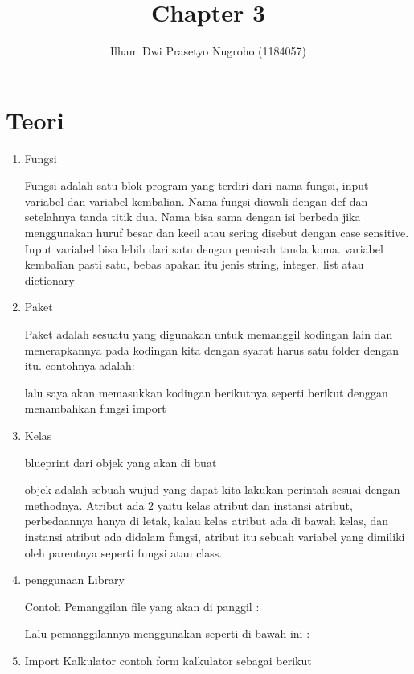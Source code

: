 \documentclass{article}
\title{Chapter 3}
\author{Ilham Dwi Prasetyo Nugroho (1184057)}
\begin{document}
\maketitle
\section{Teori}
\begin{enumerate}
\item Fungsi
\par Fungsi adalah satu blok program yang terdiri dari nama fungsi, input variabel dan variabel kembalian. Nama fungsi diawali dengan def dan setelahnya tanda titik dua. Nama bisa sama dengan isi berbeda jika menggunakan huruf besar dan kecil atau sering disebut dengan case sensitive. Input variabel bisa lebih dari satu dengan
pemisah tanda koma. variabel kembalian pasti satu, bebas apakan itu jenis string, integer, list atau dictionary

\item Paket
\par Paket adalah sesuatu yang digunakan untuk memanggil kodingan lain dan menerapkannya pada kodingan kita dengan syarat harus satu folder dengan itu.  contohnya adalah:

\par lalu saya akan memasukkan kodingan berikutnya seperti berikut denggan menambahkan fungsi import

\item Kelas
\par blueprint dari objek yang akan di buat

\par objek adalah sebuah wujud yang dapat kita lakukan perintah sesuai dengan methodnya. Atribut ada 2 yaitu kelas atribut dan instansi atribut, perbedaannya hanya di letak, kalau kelas atribut ada di bawah kelas, dan instansi atribut ada didalam fungsi, atribut itu sebuah variabel yang dimiliki oleh parentnya seperti fungsi atau class.



\item penggunaan Library
\par Contoh Pemanggilan ﬁle yang akan di panggil : 

Lalu pemanggilannya menggunakan seperti di bawah ini : 

\item Import Kalkulator
contoh form kalkulator sebagai berikut

\end{enumerate}
\end{document}
